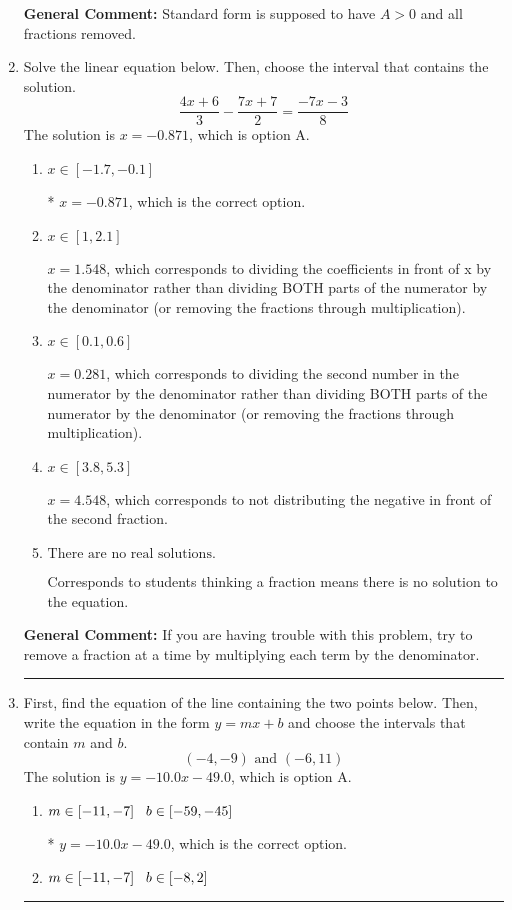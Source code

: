 \documentclass{extbook}[14pt]
\newcommand{\litem}[1]{\item #1

\rule{\textwidth}{0.4pt}}
\begin{document}
\begin{enumerate}
{\textbf{General Comment:} Standard form is supposed to have $A > 0$ and all fractions removed.
}
\litem{
Solve the linear equation below. Then, choose the interval that contains the solution.
\[ \frac{4x + 6}{3} - \frac{7x + 7}{2} = \frac{-7x -3}{8} \]The solution is \( x = -0.871 \), which is option A.\begin{enumerate}[label=\Alph*.]
\item \( x \in [-1.7, -0.1] \)

* $x = -0.871$, which is the correct option.
\item \( x \in [1, 2.1] \)

 $x = 1.548$, which corresponds to dividing the coefficients in front of x by the denominator rather than dividing BOTH parts of the numerator by the denominator (or removing the fractions through multiplication).
\item \( x \in [0.1, 0.6] \)

 $x = 0.281$, which corresponds to dividing the second number in the numerator by the denominator rather than dividing BOTH parts of the numerator by the denominator (or removing the fractions through multiplication).
\item \( x \in [3.8, 5.3] \)

 $x = 4.548$, which corresponds to not distributing the negative in front of the second fraction.
\item \( \text{There are no real solutions.} \)

Corresponds to students thinking a fraction means there is no solution to the equation.
\end{enumerate}

\textbf{General Comment:} If you are having trouble with this problem, try to remove a fraction at a time by multiplying each term by the denominator.
}
\litem{
First, find the equation of the line containing the two points below. Then, write the equation in the form $ y=mx+b $ and choose the intervals that contain $m$ and $b$.
\[ (-4, -9) \text{ and } (-6, 11) \]The solution is \( y = -10.0x -49.0 \), which is option A.\begin{enumerate}[label=\Alph*.]
\item \( m \in [-11, -7] \hspace*{3mm} b \in [-59, -45] \)

* $y = -10.0x -49.0$, which is the correct option.
\item \( m \in [-11, -7] \hspace*{3mm} b \in [-8, 2] \)


\end{enumerate}}
\end{enumerate}
\end{document}
